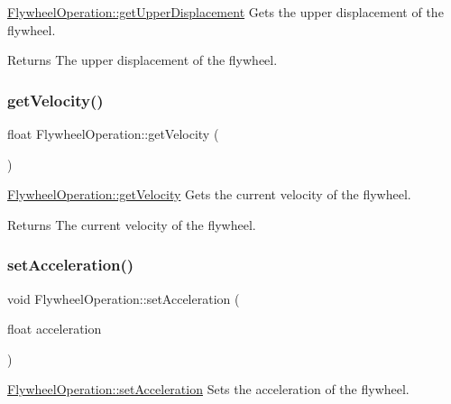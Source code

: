 \hyperlink{class_flywheel_operation_a16ebc2fe8c3297350eaf9be2114a75c8}{Flywheel\+Operation\+::get\+Upper\+Displacement} Gets the upper displacement of the flywheel. 

\begin{DoxyReturn}{Returns}
The upper displacement of the flywheel. 
\end{DoxyReturn}
\hypertarget{class_flywheel_operation_a06119af2250971d23869d94fd451ceba}{}\label{class_flywheel_operation_a06119af2250971d23869d94fd451ceba} 
\subsubsection{\texorpdfstring{get\+Velocity()}{getVelocity()}}
{\footnotesize\ttfamily float Flywheel\+Operation\+::get\+Velocity (\begin{DoxyParamCaption}{ }\end{DoxyParamCaption})}



\hyperlink{class_flywheel_operation_a06119af2250971d23869d94fd451ceba}{Flywheel\+Operation\+::get\+Velocity} Gets the current velocity of the flywheel. 

\begin{DoxyReturn}{Returns}
The current velocity of the flywheel. 
\end{DoxyReturn}
\hypertarget{class_flywheel_operation_a307929c750339cb2b46baaafa526d29f}{}\label{class_flywheel_operation_a307929c750339cb2b46baaafa526d29f} 
\subsubsection{\texorpdfstring{set\+Acceleration()}{setAcceleration()}}
{\footnotesize\ttfamily void Flywheel\+Operation\+::set\+Acceleration (\begin{DoxyParamCaption}\item[{float}]{acceleration }\end{DoxyParamCaption})}



\hyperlink{class_flywheel_operation_a307929c750339cb2b46baaafa526d29f}{Flywheel\+Operation\+::set\+Acceleration} Sets the acceleration of the flywheel. 


